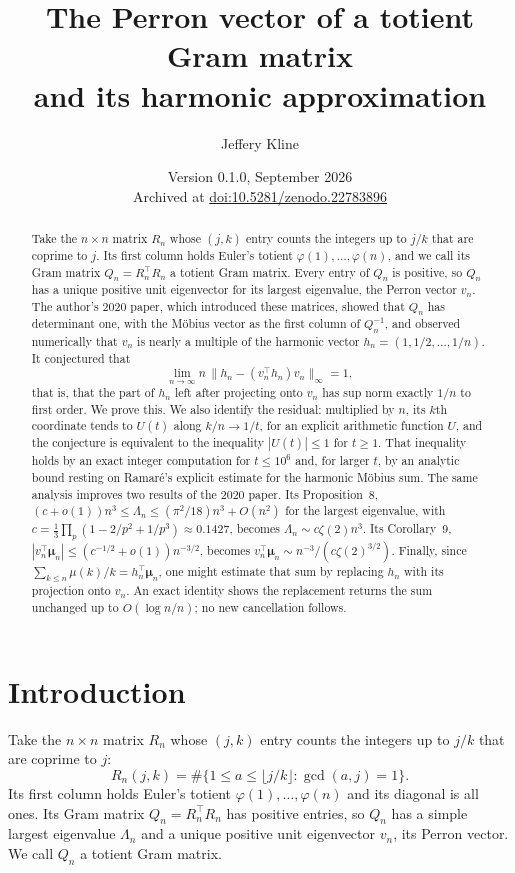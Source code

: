 \documentclass[11pt]{article}
\title{The Perron vector of a totient Gram matrix\\and its harmonic approximation}
\author{Jeffery Kline}
\date{Version 0.1.0, September 2026\\[2pt] \small Archived at \href{https://doi.org/10.5281/zenodo.22783896}{doi:10.5281/zenodo.22783896}}
\theoremstyle{remark}\newtheorem{remark}[theorem]{Remark}
\newcommand{\muvec}{\boldsymbol\mu}
\begin{document}
\maketitle
\begin{abstract}
Take the $n\times n$ matrix $R_n$ whose $(j,k)$ entry counts the integers up to $j/k$ that are coprime to $j$. Its first column holds Euler's totient $\varphi(1),\ldots,\varphi(n)$, and we call its Gram matrix $Q_n=R_n^\top R_n$ a totient Gram matrix. Every entry of $Q_n$ is positive, so $Q_n$ has a unique positive unit eigenvector for its largest eigenvalue, the Perron vector $v_n$. The author's 2020 paper, which introduced these matrices, showed that $Q_n$ has determinant one, with the M\"obius vector as the first column of $Q_n^{-1}$, and observed numerically that $v_n$ is nearly a multiple of the harmonic vector $h_n=(1,1/2,\ldots,1/n)$. It conjectured that
\[
 \lim_{n\to\infty}n\,\bigl\|h_n-(v_n^\top h_n)v_n\bigr\|_\infty=1,
\]
that is, that the part of $h_n$ left after projecting onto $v_n$ has sup norm exactly $1/n$ to first order. We prove this. We also identify the residual: multiplied by $n$, its $k$th coordinate tends to $U(t)$ along $k/n\to1/t$, for an explicit arithmetic function $U$, and the conjecture is equivalent to the inequality $|U(t)|\le1$ for $t\ge1$. That inequality holds by an exact integer computation for $t\le10^6$ and, for larger $t$, by an analytic bound resting on Ramar\'e's explicit estimate for the harmonic M\"obius sum. The same analysis improves two results of the 2020 paper. Its Proposition~8, $(c+o(1))n^3\le\Lambda_n\le(\pi^2/18)n^3+O(n^2)$ for the largest eigenvalue, with $c=\frac13\prod_p(1-2/p^2+1/p^3)\approx0.1427$, becomes $\Lambda_n\sim c\zeta(2)n^3$. Its Corollary~9, $|v_n^\top\muvec_n|\le(c^{-1/2}+o(1))n^{-3/2}$, becomes $v_n^\top\muvec_n\sim n^{-3}/(c\zeta(2)^{3/2})$. Finally, since $\sum_{k\le n}\mu(k)/k=h_n^\top\muvec_n$, one might estimate that sum by replacing $h_n$ with its projection onto $v_n$. An exact identity shows the replacement returns the sum unchanged up to $O(\log n/n)$; no new cancellation follows.
\end{abstract}

\section{Introduction}
Take the $n\times n$ matrix $R_n$ whose $(j,k)$ entry counts the integers up to $j/k$ that are coprime to $j$:
\[
 R_n(j,k)=\#\{1\le a\le\lfloor j/k\rfloor:\gcd(a,j)=1\}.
\]
Its first column holds Euler's totient $\varphi(1),\ldots,\varphi(n)$ and its diagonal is all ones. Its Gram matrix $Q_n=R_n^\top R_n$ has positive entries, so $Q_n$ has a simple largest eigenvalue $\Lambda_n$ and a unique positive unit eigenvector $v_n$, its Perron vector. We call $Q_n$ a totient Gram matrix.
\end{document}
